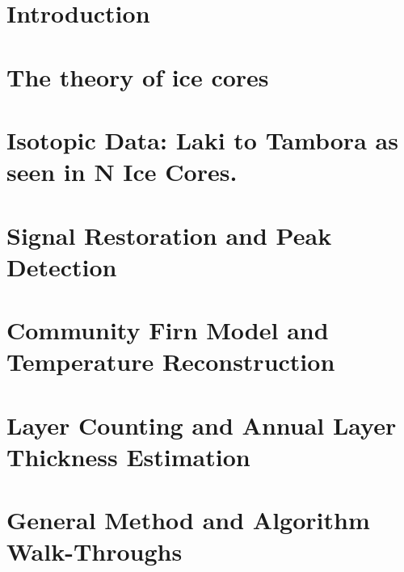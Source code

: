 \documentclass[11pt]{memoir}
\begin{document}
\newpage
 

\tableofcontents*{}


\newpage
\listoffigures

\listoftables

\lstlistoflistings


\mainmatter

\chapter[Introduction][Introduction]{Introduction}




\chapter[Ice Theory][Ice Theory]{The theory of ice cores}





\chapter[Data][Data]{Isotopic Data: Laki to Tambora as seen in N Ice Cores.}




\chapter[Signal Analysis][Signal Analysis]{Signal Restoration and Peak Detection}





\chapter[Temperature Reconstruction]{Community Firn Model and Temperature Reconstruction}




\chapter[Layer Counting][Layer Counting]{Layer Counting and Annual Layer Thickness Estimation}



\chapter[Method][Method]{General Method and Algorithm Walk-Throughs}



\backmatter

 


	
\end{document}
